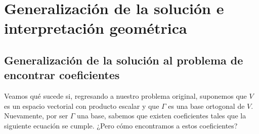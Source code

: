 \documentclass[12pt,dvipsnames]{article}
\numberwithin{equation}{section}
\begin{document}



\section{Generalización de la solución e interpretación geométrica}

\subsection{Generalización de la solución al problema de encontrar coeficientes}

Veamos qué sucede si, regresando a nuestro problema original, suponemos que $V$ es un espacio vectorial con producto escalar y que $\Gamma$ es una base ortogonal de $V$. Nuevamente, por ser $\Gamma$ una base, sabemos que existen coeficientes tales que la siguiente ecuación se cumple. ¿Pero cómo encontramos a estos coeficientes?
\end{document}
